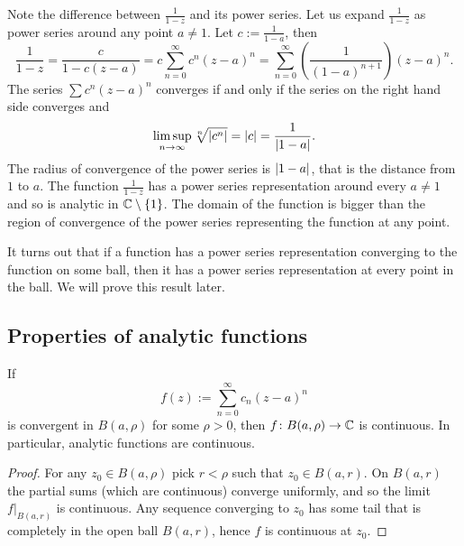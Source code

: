 \begin{example}
Note the difference between $\frac{1}{1-z}$ and its power series.  Let us
expand $\frac{1}{1-z}$ as power series around any point $a \not= 1$.
Let $c := \frac{1}{1-a}$, then
\begin{equation*}
\frac{1}{1-z} = 
\frac{c}{1-c(z-a)}
=
c
\sum_{n=0}^\infty c^{n} {(z-a)}^n
=
\sum_{n=0}^\infty \left( \frac{1}{{(1-a)}^{n+1}} \right) {(z-a)}^n .
\end{equation*}
The series $\sum c^n {(z-a)}^n$ converges if and only if 
the series on the right hand side converges and
\begin{equation*}
\limsup_{n\to\infty}
\sqrt[n]{\lvert {c^n} \rvert} = \lvert {c} \rvert
= \frac{1}{\lvert {1-a} \rvert} .
\end{equation*}
The radius of convergence of the power series is $\lvert {1-a} \rvert$, that is the
distance from $1$ to $a$.  The function $\frac{1}{1-z}$
has a power series
representation around every $a\not= 1$ and so is analytic in ${\mathbb{C}} \setminus
\{ 1 \}$.
The domain of the function is bigger than the region
of convergence of the power series representing the function at any point.
\end{example}

It turns out that 
if a function has a power series representation converging to the function
on some ball,
then it has a power series representation at every point in the ball.  We will prove this
result later.

\subsection{Properties of analytic functions}

\begin{prop}
If
\begin{equation*}
f(z) := \sum_{n=0}^\infty c_n {(z-a)}^n
\end{equation*}
is convergent in $B(a,\rho)$ for some $\rho > 0$, then
$f \colon B(a,\rho) \to {\mathbb{C}}$ is continuous.
In particular, analytic functions are continuous.
\end{prop}

\begin{proof}
For any $z_0 \in B(a,\rho)$ pick $r < \rho$ such that $z_0 \in B(a,r)$.
On $B(a,r)$ the
partial sums (which are continuous) converge uniformly,
and so the limit $f|_{B(a,r)}$ is continuous.
Any sequence converging to
$z_0$ has some tail that is completely in the open ball $B(a,r)$,
hence $f$ is continuous at $z_0$.
\end{proof}

